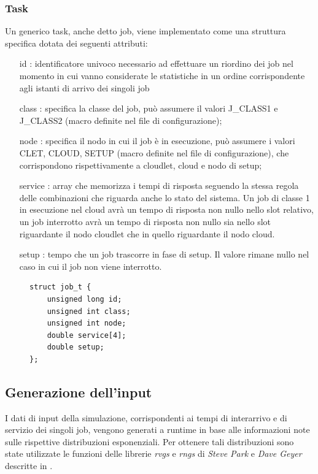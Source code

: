\subsubsection{Task}
Un generico task, anche detto job, viene implementato come una struttura
specifica dotata dei seguenti attributi: 
\begin{itemize}
\item[id]: identificatore univoco necessario ad effettuare un riordino dei job
nel momento in cui vanno considerate le statistiche in un ordine corrispondente
agli istanti di arrivo dei singoli job
\item[class]: specifica la classe del job, può assumere il valori J\_CLASS1 e
J\_CLASS2 (macro definite nel file di configurazione); 
\item[node]: specifica il nodo in cui il job è in esecuzione, può assumere i
valori CLET, CLOUD, SETUP (macro definite nel file di configurazione), che
corrispondono rispettivamente a cloudlet, cloud e nodo di setup; 
\item[service]: array che memorizza i tempi di risposta seguendo la stessa regola
delle combinazioni che riguarda anche lo stato del sistema. Un job di classe 1
in esecuzione nel cloud avrà un tempo di risposta non nullo nello slot relativo,
un job interrotto avrà un tempo di risposta non nullo sia nello slot riguardante
il nodo cloudlet che in quello riguardante il nodo cloud. 
\item[setup]: tempo che un job trascorre in fase di setup. Il valore rimane
nullo nel caso in cui il job non viene interrotto.  
%
\end{itemize}
\begin{figure}[!h]
\begin{lstlisting}[title=basic.h]
struct job_t {
    unsigned long id;
    unsigned int class;
    unsigned int node;
    double service[4];
    double setup;
};
\end{lstlisting}
\end{figure}
%
%
\subsection{Generazione dell'input}
I dati di input della simulazione, corrispondenti ai tempi di interarrivo e di
servizio dei singoli job, vengono generati a runtime in base alle informazioni
note sulle rispettive distribuzioni esponenziali. Per ottenere tali
distribuzioni sono state utilizzate le funzioni delle librerie \emph{rvgs} e
\emph{rngs} di \emph{Steve Park} e \emph{Dave Geyer} descritte in \cite{leemis}.

